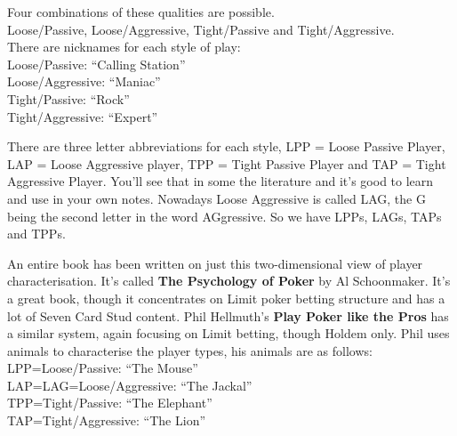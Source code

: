 
Four combinations of these qualities are possible. \\
Loose/Passive, Loose/Aggressive, Tight/Passive and Tight/Aggressive. \\
There are nicknames for each style of play: \\
Loose/Passive: ``Calling Station'' \\
Loose/Aggressive: ``Maniac'' \\
Tight/Passive: ``Rock'' \\
Tight/Aggressive: ``Expert''

There are three letter abbreviations for each style, LPP = Loose
Passive Player, LAP = Loose Aggressive player, TPP = Tight Passive
Player and TAP = Tight Aggressive Player. You'll see that in some the
literature and it's good to learn and use in your own notes. Nowadays
Loose Aggressive is called LAG, the G being the second letter in the
word AGgressive. So we have LPPs, LAGs, TAPs and TPPs.


An entire book has been written on just this two-dimensional view
of player characterisation. It's called \textbf{The Psychology of Poker}
by Al Schoonmaker. It's a great book, though it concentrates
on Limit poker betting structure and has a lot of Seven Card Stud
content. Phil Hellmuth's \textbf{Play Poker like the Pros} has a
similar system, again focusing on Limit betting, though Holdem only.
Phil uses animals to characterise the player types, his animals are
as follows: \\
LPP=Loose/Passive: ``The Mouse'' \\
LAP=LAG=Loose/Aggressive: ``The Jackal'' \\
TPP=Tight/Passive: ``The Elephant'' \\
TAP=Tight/Aggressive: ``The Lion''


